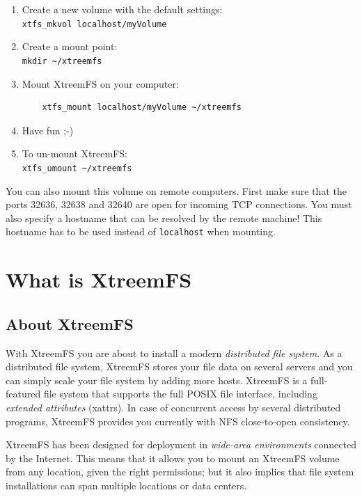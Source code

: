 \documentclass[a4paper,10pt]{book}
\begin{document}
\begin{enumerate}
\item Create a new volume with the default settings:\\
	\texttt{xtfs\_mkvol localhost/myVolume}

\item Create a mount point:\\
	\texttt{mkdir \~{}/xtreemfs}

\item Mount XtreemFS on your computer:
	\begin{verbatim}
	xtfs_mount localhost/myVolume ~/xtreemfs
	\end{verbatim}


\item Have fun ;-)

\item To un-mount XtreemFS:\\
	\texttt{xtfs\_umount \~{}/xtreemfs}
\end{enumerate}

You can also mount this volume on remote computers. First make sure that the ports 32636, 32638 and 32640 are open for incoming TCP connections. You must also specify a hostname that can be resolved by the remote machine! This hostname has to be used instead of \texttt{localhost} when mounting.

\chapter{What is XtreemFS}
\setcounter{page}{1}

\section{About XtreemFS}

With XtreemFS you are about to install a modern \emph{distributed file system}. As a distributed file system, XtreemFS stores your file data on several servers and you can simply scale your file system by adding more hosts. XtreemFS is a full-featured file system that supports the full POSIX file interface, including \emph{extended attributes} (xattrs). In case of concurrent access by several distributed programs, XtreemFS provides you currently with NFS close-to-open consistency.

XtreemFS has been designed for deployment in \emph{wide-area environments} connected by the Internet. This means that it allows you to mount an XtreemFS volume from any location, given the right permissions; but it also implies that file system installations can span multiple locations or data centers.
\end{document}
